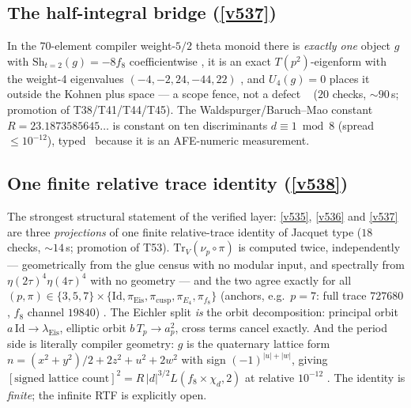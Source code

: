 \documentclass[11pt,a4paper]{article}
\begin{document}
\subsection{The half-integral bridge (\texorpdfstring{\vref{v537}}{v537})}
In the $70$-element compiler weight-$5/2$ theta monoid there is \emph{exactly one} object $g$ with
$\mathrm{Sh}_{t=2}(g)=-8f_8$ coefficientwise \mE, it is an exact $T(p^2)$-eigenform with the
weight-4 eigenvalues $(-4,-2,24,-44,22)$ \mE, and $U_4(g)=0$ places it outside the Kohnen plus space
--- a scope fence, not a defect \mE\  ($20$ checks, ${\sim}90$\,s;
promotion of T38/T41/T44/T45). The Waldspurger/Baruch--Mao constant
$R=23.1873585645\ldots$ is constant on ten discriminants $d\equiv1\bmod 8$ (spread $\le10^{-12}$),
typed \mC\ because it is an AFE-numeric measurement.

\subsection{One finite relative trace identity (\texorpdfstring{\vref{v538}}{v538})}
The strongest structural statement of the verified layer: \vref{v535}, \vref{v536} and \vref{v537} are
three \emph{projections} of one finite relative-trace identity of Jacquet type
 ($18$ checks, ${\sim}14$\,s; promotion of T53).
$\mathrm{Tr}_V(\nu_p\circ\pi)$ is computed twice, independently --- geometrically from the glue census
with no modular input, and spectrally from $\eta(2\tau)^4\eta(4\tau)^4$ with no geometry --- and the
two agree exactly for all $(p,\pi)\in\{3,5,7\}\times\{\mathrm{Id},\pi_{\mathrm{Eis}},
\pi_{\mathrm{cusp}},\pi_{E_4},\pi_{f_8}\}$ (anchors, e.g.\ $p=7$: full trace $727680$, $f_8$ channel
$19840$) \mE. The Eichler split \emph{is} the orbit decomposition: principal orbit
$a\,\mathrm{Id}\to\lambda_{\mathrm{Eis}}$, elliptic orbit $b\,T_p\to a_p^2$, cross terms cancel exactly.
And the period side is literally compiler geometry: $g$ is the quaternary lattice form
$n=(x^2+y^2)/2+2z^2+u^2+2w^2$ with sign $(-1)^{|u|+|w|}$, giving
$[\text{signed lattice count}]^2=R\,|d|^{3/2}L(f_8\times\chi_d,2)$ at relative $10^{-12}$ \mC.
The identity is \emph{finite}; the infinite RTF is explicitly open.
\end{document}
